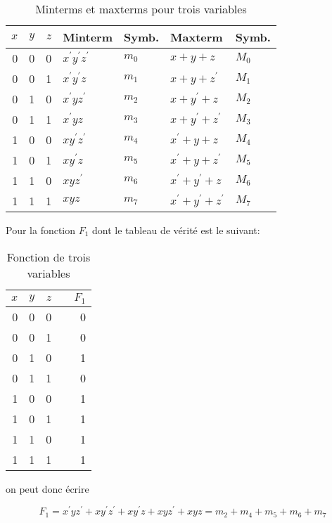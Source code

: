 \documentclass[letter, oneside]{book}
\begin{document}
\begin{enumerate}
\begin{table}[htbp]
\caption{\label{tab:org41997db}Minterms et maxterms pour trois variables}
\centering
\begin{tabular}{rrrllll}
\(x\) & \(y\) & \(z\) & Minterm & Symb. & Maxterm & Symb.\\[0pt]
\hline
0 & 0 & 0 & \(x^\prime y^\prime z^\prime\) & \(m_0\) & \(x+ y+ z\) & \(M_0\)\\[0pt]
0 & 0 & 1 & \(x^\prime y^\prime z\) & \(m_1\) & \(x+ y+ z^\prime\) & \(M_1\)\\[0pt]
0 & 1 & 0 & \(x^\prime y z^\prime\) & \(m_2\) & \(x+ y^\prime+ z\) & \(M_2\)\\[0pt]
0 & 1 & 1 & \(x^\prime y z\) & \(m_3\) & \(x+ y^\prime+ z^\prime\) & \(M_3\)\\[0pt]
1 & 0 & 0 & \(x y^\prime z^\prime\) & \(m_4\) & \(x^\prime+ y+ z\) & \(M_4\)\\[0pt]
1 & 0 & 1 & \(x y^\prime z\) & \(m_5\) & \(x^\prime+ y+ z^\prime\) & \(M_5\)\\[0pt]
1 & 1 & 0 & \(x y z^\prime\) & \(m_6\) & \(x^\prime+ y^\prime+ z\) & \(M_6\)\\[0pt]
1 & 1 & 1 & \(x y z\) & \(m_7\) & \(x^\prime + y^\prime+ z^\prime\) & \(M_7\)\\[0pt]
\end{tabular}
\end{table}

Pour la fonction \(F_1\) dont le tableau de vérité est le suivant: 

\begin{table}[htbp]
\caption{\label{tab:orgeb71576}Fonction de trois variables}
\centering
\begin{tabular}{rrrlr}
\(x\) & \(y\) & \(z\) &  & \(F_1\)\\[0pt]
\hline
0 & 0 & 0 &  & 0\\[0pt]
0 & 0 & 1 &  & 0\\[0pt]
0 & 1 & 0 &  & 1\\[0pt]
0 & 1 & 1 &  & 0\\[0pt]
1 & 0 & 0 &  & 1\\[0pt]
1 & 0 & 1 &  & 1\\[0pt]
1 & 1 & 0 &  & 1\\[0pt]
1 & 1 & 1 &  & 1\\[0pt]
\end{tabular}
\end{table}

on peut donc écrire

$$ F_1 = x^\prime y
z^\prime + x y^\prime z^\prime + x y^\prime z + x y z^\prime + x y z =
m_2 + m_4 + m_5 + m_6 + m_7 $$


\end{enumerate}
\end{document}
